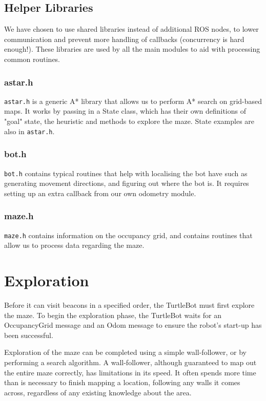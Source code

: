 \documentclass[titlepage,12pt,a4paper]{article}
\begin{document}
\subsection{Helper Libraries}
We have chosen to use shared libraries instead of additional ROS nodes, to lower communication and prevent more handling of callbacks (concurrency is hard enough!). These libraries are used by all the main modules to aid with processing common routines.

\subsubsection{astar.h}
\verb|astar.h| is a generic A* library that allows us to perform A* search on grid-based maps. It works by passing in a State class, which has their own definitions of "goal" state, the heuristic and methods to explore the maze. State examples are also in \verb|astar.h|.

\subsubsection{bot.h}
\verb|bot.h| contains typical routines that help with localising the bot have such as generating movement directions, and figuring out where the bot is. It requires setting up an extra callback from our own odometry module.

\subsubsection{maze.h}
\verb|maze.h| contains information on the occupancy grid, and contains routines that allow us to process data regarding the maze.


\pagebreak
\section{Exploration}

Before it can visit beacons in a specified order, the TurtleBot must first explore the maze. To begin the exploration phase, the TurtleBot waits for an OccupancyGrid message and an Odom message to ensure the robot's start-up has been successful. 

Exploration of the maze can be completed using a simple wall-follower, or by performing a search algorithm. A wall-follower, although guaranteed to map out the entire maze correctly, has limitations in its speed. It often spends more time than is necessary to finish mapping a location, following any walls it comes across, regardless of any existing knowledge about the area.
\end{document}
